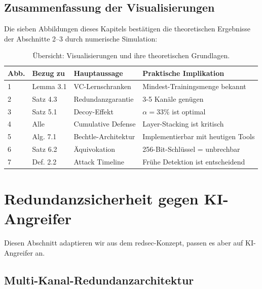 \documentclass[a4paper,12pt]{article}
\theoremstyle{definition}
\begin{document}
\subsection{Zusammenfassung der Visualisierungen}

Die sieben Abbildungen dieses Kapitels bestätigen die theoretischen Ergebnisse der Abschnitte 2--3 durch numerische Simulation:

\begin{table}[H]
\centering
\begin{tabular}{|l|l|l|l|}
\hline
\textbf{Abb.} & \textbf{Bezug zu} & \textbf{Hauptaussage} & \textbf{Praktische Implikation} \\
\hline
1 & Lemma 3.1 & VC-Lernschranken & Mindest-Trainingsmenge bekannt \\
2 & Satz 4.3 & Redundanzgarantie & 3-5 Kanäle genügen \\
3 & Satz 5.1 & Decoy-Effekt & $\alpha = 33\%$ ist optimal \\
4 & Alle & Cumulative Defense & Layer-Stacking ist kritisch \\
5 & Alg. 7.1 & Bechtle-Architektur & Implementierbar mit heutigen Tools \\
6 & Satz 6.2 & Äquivokation & 256-Bit-Schlüssel = unbrechbar \\
7 & Def. 2.2 & Attack Timeline & Frühe Detektion ist entscheidend \\
\hline
\end{tabular}
\caption{Übersicht: Visualisierungen und ihre theoretischen Grundlagen.}
\label{tab:vis_summary}
\end{table}

\section{Redundanzsicherheit gegen KI-Angreifer}

Diesen Abschnitt adaptieren wir aus dem redsec-Konzept, passen es aber auf KI-Angreifer an.

\subsection{Multi-Kanal-Redundanzarchitektur}
\end{document}
